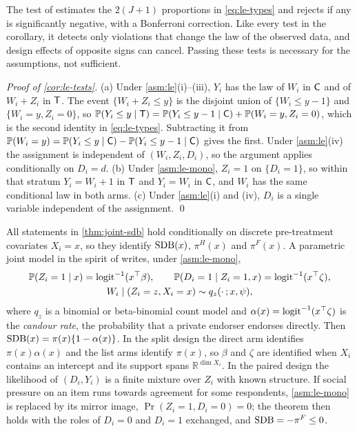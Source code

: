 The test of \citet{blair2012} estimates the $2(J+1)$ proportions in \eqref{eq:le-types} and rejects if any is significantly negative, with a Bonferroni correction. Like every test in the corollary, it detects only violations that change the law of the observed data, and design effects of opposite signs can cancel. Passing these tests is necessary for the assumptions, not sufficient.

\emph{Proof of \cref{cor:le-tests}.} (a) Under \cref{asm:le}(i)--(iii), $Y_i$ has the law of $W_i$ in $\mathsf{C}$ and of $W_i+Z_i$ in $\mathsf{T}$. The event $\{W_i+Z_i\le y\}$ is the disjoint union of $\{W_i\le y-1\}$ and $\{W_i=y,Z_i=0\}$, so $\mathbb{P}(Y_i\le y\mid\mathsf{T})=\mathbb{P}(Y_i\le y-1\mid\mathsf{C})+\mathbb{P}(W_i=y,Z_i=0)$, which is the second identity in \eqref{eq:le-types}. Subtracting it from $\mathbb{P}(W_i=y)=\mathbb{P}(Y_i\le y\mid\mathsf{C})-\mathbb{P}(Y_i\le y-1\mid\mathsf{C})$ gives the first. Under \cref{asm:le}(iv) the assignment is independent of $(W_i,Z_i,D_i)$, so the argument applies conditionally on $D_i=d$.
(b) Under \cref{asm:le-mono}, $Z_i=1$ on $\{D_i=1\}$, so within that stratum $Y_i=W_i+1$ in $\mathsf{T}$ and $Y_i=W_i$ in $\mathsf{C}$, and $W_i$ has the same conditional law in both arms.
(c) Under \cref{asm:le}(i) and (iv), $D_i$ is a single variable independent of the assignment. \qed

\begin{remark}\label{rem:le-joint}
All statements in \cref{thm:joint-sdb} hold conditionally on discrete pre-treatment covariates $X_i=x$, so they identify $\mathrm{SDB}(x)$, $\pi^H(x)$ and $\pi^F(x)$. A parametric joint model in the spirit of \citet{imai2011} writes, under \cref{asm:le-mono},
\begin{equation}\label{eq:le-joint}
\begin{gathered}
  \mathbb{P}(Z_i=1\mid x)=\operatorname{logit}^{-1}(x^\top\beta),\qquad
  \mathbb{P}(D_i=1\mid Z_i=1,x)=\operatorname{logit}^{-1}(x^\top\zeta),\\
  W_i\mid(Z_i=z,X_i=x)\sim q_z(\cdot\,;x,\psi),
\end{gathered}
\end{equation}
where $q_z$ is a binomial or beta-binomial count model \citep{imai2011} and $\alpha(x)=\operatorname{logit}^{-1}(x^\top\zeta)$ is the \emph{candour rate}, the probability that a private endorser endorses directly. Then $\mathrm{SDB}(x)=\pi(x)\{1-\alpha(x)\}$. In the split design the direct arm identifies $\pi(x)\alpha(x)$ and the list arms identify $\pi(x)$, so $\beta$ and $\zeta$ are identified when $X_i$ contains an intercept and its support spans $\mathbb R^{\dim X_i}$. In the paired design the likelihood of $(D_i,Y_i)$ is a finite mixture over $Z_i$ with known structure. If social pressure on an item runs towards agreement for some respondents, \cref{asm:le-mono} is replaced by its mirror image, $\Pr(Z_i=1,D_i=0)=0$; the theorem then holds with the roles of $D_i=0$ and $D_i=1$ exchanged, and $\mathrm{SDB}=-\pi^F\le0$.
\end{remark}

